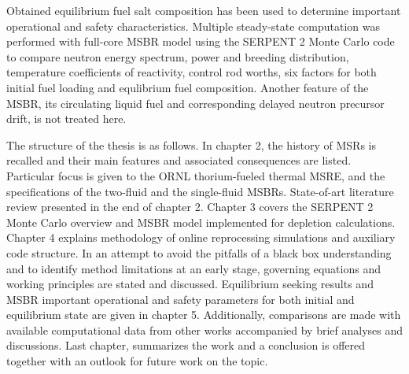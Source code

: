 Obtained equilibrium fuel salt composition has been used to determine important operational and safety characteristics. Multiple steady-state computation was performed with full-core \gls{MSBR} model using the SERPENT 2 Monte Carlo code to compare neutron energy spectrum, power and breeding distribution, temperature coefficients of reactivity, control rod worths, six factors for both initial fuel loading and equlibrium fuel composition.
Another feature of the \gls{MSBR}, its circulating liquid fuel and corresponding delayed neutron precursor drift, is not treated here.

The structure of the thesis is as follows. In chapter 2, the history of \glspl{MSR} is recalled and their main features and associated consequences are listed. Particular focus is given to the \gls{ORNL} thorium-fueled thermal \gls{MSRE}, and the specifications of the two-fluid and the single-fluid \glspl{MSBR}. State-of-art literature review presented in the end of chapter 2. Chapter 3 covers the SERPENT 2 Monte Carlo overview and \gls{MSBR} model implemented for depletion calculations. Chapter 4 explains methodology of online reprocessing simulations and auxiliary code structure. In an attempt to avoid the pitfalls of a black box understanding and to identify method limitations at an early stage, governing equations and working principles are stated and discussed. Equilibrium seeking results and \gls{MSBR} important operational and safety parameters for both initial and equilibrium state are given in chapter 5. Additionally,
comparisons are made with available computational data from other works accompanied by brief analyses and discussions. Last chapter, summarizes the work and a conclusion is offered together with an outlook for future work on the topic. 
